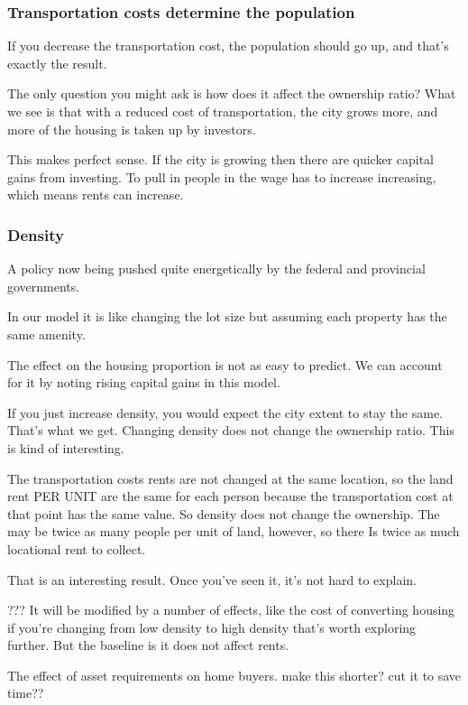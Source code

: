 \documentclass[]{article}
\begin{document}
\subsubsection{Transportation costs  determine the population} 

If you decrease the transportation cost, the population should go up, and that’s exactly the result.

The only question you might ask is how does it affect the ownership ratio? What we see is that with a reduced cost of transportation, the city grows more, and more of the housing is taken up by investors.

This makes perfect sense. If the city is growing then there are quicker capital gains from investing. To pull in people in the wage has to increase increasing, which means rents can increase.

\subsubsection{Density}

A policy now being pushed quite energetically by the federal and provincial governments.

In our model it is like changing the lot size but assuming each property has the same amenity.

The effect on the housing proportion is not as easy to predict. We can account for it by noting rising capital gains in this model.

If you just increase density, you would expect the city extent to stay the same. That’s what we get.
Changing density does not change the ownership ratio. This is kind of interesting.

The transportation costs rents are not changed at the same location, so the land rent PER UNIT are the same for each person because the transportation cost at that point has the same value. So density does not change the ownership.
The may be twice as many people per unit of land, however, so there Is twice as much locational rent to collect.

That is an interesting result. Once you’ve seen it, it’s not hard to explain.

??? It will be modified by a number of effects, like the cost of converting housing if you’re changing from low density to high density that’s worth exploring further. But the baseline is it does not affect rents.

The effect of asset requirements on home buyers. make this shorter? cut it to save time??
\end{document}
